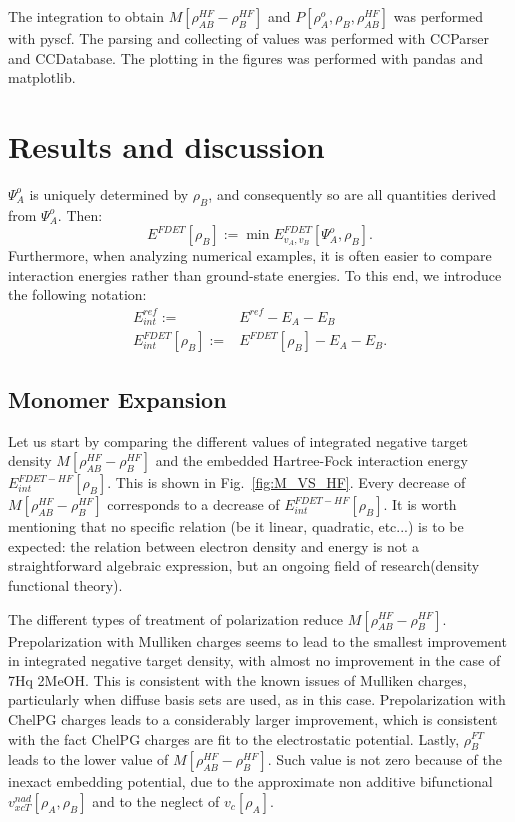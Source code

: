 \documentclass[journal=jctcce,manuscript=article, layout=twocolumn]{achemso}
\begin{document}
The integration to obtain $M[\rho^{HF}_{AB} - \rho^{HF}_{B}]$ and $P[\rho^{o}_A, \rho_B, \rho^{HF}_{AB}]$ was performed with  pyscf\cite{PYSCF}.
The parsing and collecting of values was performed with CCParser\cite{CCParser} and CCDatabase\cite{CCDatabase}. The plotting in the figures was performed with pandas\cite{PANDAS} and matplotlib\cite{Hunter2007}.

\section{Results and discussion}
$\Psi^{o}_A$ is uniquely determined by $\rho_B$, and consequently so are all quantities derived from $\Psi^{o}_A$. Then:
\begin{equation}
 E^{FDET}[\rho_B] := \min E_{v_A,v_B}^{FDET}[\Psi^{o}_{A},\rho_B].
\end{equation}
Furthermore, when analyzing numerical examples, it is often easier to compare interaction energies rather than ground-state energies. To this end, we introduce the following notation:
\begin{align}
 E^{ref}_{int} := & E^{ref} - E_A - E_B \\ \nonumber
 E^{FDET}_{int}[\rho_B] := & E^{FDET}[\rho_B] - E_A - E_B.
\end{align}
\subsection{Monomer Expansion}
Let us start by comparing the different values of integrated negative target density $M[\rho^{HF}_{AB} - \rho^{HF}_{B}]$ and the embedded Hartree-Fock interaction energy $E^{FDET-HF}_{int}[\rho_B]$. This is shown in Fig.~\ref{fig:M_VS_HF}.
Every decrease of $M[\rho^{HF}_{AB} - \rho^{HF}_{B}]$ corresponds to a decrease of $E^{FDET-HF}_{int}[\rho_B]$. It is worth mentioning that no specific relation (be it linear, quadratic, etc...) is to be expected: the relation between electron density and energy is not a straightforward algebraic expression, but an ongoing field of research(density functional theory).

The different types of treatment of polarization reduce $M[\rho^{HF}_{AB} - \rho^{HF}_{B}]$. Prepolarization with Mulliken charges seems to lead to the smallest improvement in integrated negative target density, with almost no improvement in the case of 7Hq 2MeOH. This is consistent with the known issues of Mulliken charges, particularly when diffuse basis sets are used, as in this case.
Prepolarization with ChelPG charges leads to a considerably larger improvement, which is consistent with the fact ChelPG charges are fit to the electrostatic potential.
Lastly, $\rho_B^{FT}$ leads to the lower value of $M[\rho^{HF}_{AB} - \rho^{HF}_{B}]$. Such value is not zero because of the inexact embedding potential, due to the approximate non additive bifunctional $v_{xcT}^{nad}[\rho_A, \rho_B]$ and to the neglect of $v_c[\rho_A]$. 
\end{document}
